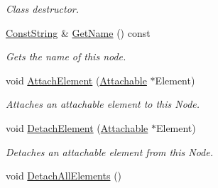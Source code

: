 \begin{DoxyCompactItemize}
\begin{DoxyCompactList}\small\item\em Class destructor. \item\end{DoxyCompactList}\item 
\hyperlink{namespacephys_a5ce5049f8b4bf88d6413c47b504ebb31}{ConstString} \& \hyperlink{classphys_1_1WorldNode_ae3c12e7aced8f84e2191a5e08e2767a8}{GetName} () const 
\begin{DoxyCompactList}\small\item\em Gets the name of this node. \item\end{DoxyCompactList}\item 
void \hyperlink{classphys_1_1WorldNode_a82710a08f767447266c1307b55a5636b}{AttachElement} (\hyperlink{classphys_1_1Attachable}{Attachable} $\ast$Element)
\begin{DoxyCompactList}\small\item\em Attaches an attachable element to this Node. \item\end{DoxyCompactList}\item 
void \hyperlink{classphys_1_1WorldNode_ab5ce9ccc5dea9a450f3f72442ca10cf5}{DetachElement} (\hyperlink{classphys_1_1Attachable}{Attachable} $\ast$Element)
\begin{DoxyCompactList}\small\item\em Detaches an attachable element from this Node. \item\end{DoxyCompactList}\item 
\hypertarget{classphys_1_1WorldNode_acf433bc8dbe404cbaf4cb9e2264a7a84}{
void \hyperlink{classphys_1_1WorldNode_acf433bc8dbe404cbaf4cb9e2264a7a84}{DetachAllElements} ()}
\label{d2/d3e/classphys_1_1WorldNode_acf433bc8dbe404cbaf4cb9e2264a7a84}


\end{DoxyCompactItemize}
